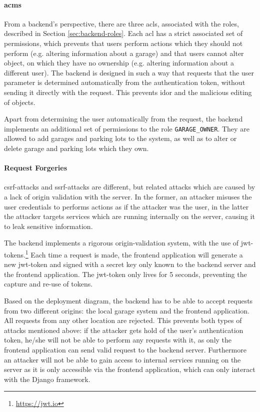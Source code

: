 \paragraph{\acp{acm}}
From a backend's perspective, there are three \acp{acl}, associated with the roles, described in Section \ref{sec:backend-roles}. Each \ac{acl} has a strict associated set of permissions, which prevents that users perform actions which they should not perform (e.g. altering information about a garage) and that users cannot alter object, on which they have no ownership (e.g. altering information about a different user). The backend is designed in such a way that requests that the user parameter is determined automatically from the authentication token, without sending it directly with the request. This prevents \ac{idor} and the malicious editing of objects. 

\ind Apart from determining the user automatically from the request, the backend implements an additional set of permissions to the role \verb+GARAGE_OWNER+. They are allowed to add garages and parking lots to the system, as well as to alter or delete garage and parking lots which they own.


\paragraph{Request Forgeries}
\ac{csrf}-attacks and \ac{ssrf}-attacks are different, but related attacks which are caused by a lack of origin validation with the server. In the former, an attacker misuses the user credentials to performs actions as if the attacker was the user, in the latter the attacker targets services which are running internally on the server, causing it to leak sensitive information.

\ind The backend implements a rigorous origin-validation system, with the use of \ac{jwt}-tokens.\footnote{\url{https://jwt.io}} Each time a request is made, the frontend application will generate a new \ac{jwt}-token and signed with a secret key only known to the backend server and the frontend application. The \ac{jwt}-token only lives for 5 seconds, preventing the capture and re-use of tokens. 

\ind Based on the deployment diagram, the backend has to be able to accept requests from two different origins: the local garage system and the frontend application. All requests from any other location are rejected. This prevents both types of attacks mentioned above: if the attacker gets hold of the user's authentication token, he/she will not be able to perform any requests with it, as only the frontend application can send valid request to the backend server. Furthermore an attacker will not be able to gain access to internal services running on the server as it is only accessible via the frontend application, which can only interact with the Django framework.


